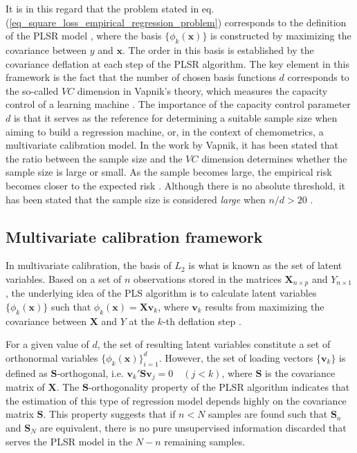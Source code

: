 \documentclass[journal=ancham,manuscript=article]{achemso}
\begin{document}
It is in this regard that the problem stated in eq. (\ref{eq_square_loss_empirical_regression_problem}) corresponds to the definition of the PLSR model  \cite{Stone1990}, where the basis $\{\phi_{k}(\mathbf{x})\}$ is constructed by maximizing the covariance between $y$ and $\mathbf{x}$. The order in this basis is established by the covariance deflation at each step of the PLSR algorithm. The key element in this framework is the fact that the number of chosen basis functions $d$ corresponds to the so-called $VC$ dimension in Vapnik's theory, which measures the capacity control of a learning machine \cite{Vapnik2019}. The importance of the capacity control parameter $d$ is that it serves as the reference for determining a suitable sample size when aiming to build a regression machine, or, in the context of chemometrics, a multivariate calibration model. In the work by Vapnik, it has been stated that the ratio between the sample size and the $VC$ dimension determines whether the sample size is large or small. As the sample becomes large, the empirical risk becomes closer to the expected risk \cite{Vapnik2000}. Although there is no absolute threshold, it has been stated that the sample size is considered \emph{large} when  $n/d>20$ \cite{Vapnik2000}.


\subsection{Multivariate calibration framework}

In multivariate calibration, the basis of $L_2$ is what is known as the set of latent variables. Based on a set of $n$ observations stored in the matrices $\mathbf{X}_{n\times p}$ and $Y_{n\times 1}$, the underlying idea of the PLS algorithm is to calculate latent variables $\{\phi_{k}(\mathbf{x})\}$ such that $\phi_k(\mathbf{x}) = \mathbf{Xv}_{k}$, where $\mathbf{v}_k$ results from maximizing the covariance between $\mathbf{X}$ and $Y$ at the $k$-th deflation step \cite{DeJong1993}. 

For a given value of $d$, the set of resulting latent variables constitute a set of orthonormal variables $\{\phi_{k}(\mathbf{x})\}_{i=1}^d$. However, the set of loading vectors $\{\mathbf{v}_k\}$ is defined as $\mathbf{S}$-orthogonal, i.e. $\mathbf{v}_k'\mathbf{S}\mathbf{v}_j = 0 \quad (j<k)$, where $\mathbf{S}$ is the covariance matrix of $\mathbf{X}$. The $\mathbf{S}$-orthogonality property of the PLSR algorithm indicates that the estimation of this type of regression model depends highly on the covariance matrix $\mathbf{S}$. This property suggests that if $n<N$ samples are found such that $\mathbf{S}_n$ and $\mathbf{S}_N$ are equivalent, there is no pure unsupervised information discarded that serves the PLSR model in the $N-n$ remaining samples.
\end{document}
